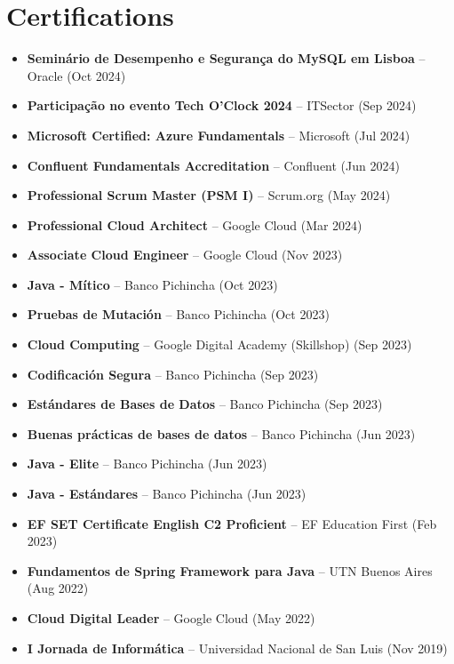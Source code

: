 \documentclass[10pt, letterpaper]{article}
\begin{document}
\section{Certifications}
\begin{itemize}[leftmargin=10pt, noitemsep]
    \item \textbf{Seminário de Desempenho e Segurança do MySQL em Lisboa} – Oracle (Oct 2024)
    \item \textbf{Participação no evento Tech O'Clock 2024} – ITSector (Sep 2024)
    \item \textbf{Microsoft Certified: Azure Fundamentals} – Microsoft (Jul 2024)
    \item \textbf{Confluent Fundamentals Accreditation} – Confluent (Jun 2024)
    \item \textbf{Professional Scrum Master (PSM I)} – Scrum.org (May 2024)
    \item \textbf{Professional Cloud Architect} – Google Cloud (Mar 2024)
    \item \textbf{Associate Cloud Engineer} – Google Cloud (Nov 2023)
    \item \textbf{Java - Mítico} – Banco Pichincha (Oct 2023)
    \item \textbf{Pruebas de Mutación} – Banco Pichincha (Oct 2023)
    \item \textbf{Cloud Computing} – Google Digital Academy (Skillshop) (Sep 2023)
    \item \textbf{Codificación Segura} – Banco Pichincha (Sep 2023)
    \item \textbf{Estándares de Bases de Datos} – Banco Pichincha (Sep 2023)
    \item \textbf{Buenas prácticas de bases de datos} – Banco Pichincha (Jun 2023)
    \item \textbf{Java - Elite} – Banco Pichincha (Jun 2023)
    \item \textbf{Java - Estándares} – Banco Pichincha (Jun 2023)
    \item \textbf{EF SET Certificate English C2 Proficient} – EF Education First (Feb 2023)
    \item \textbf{Fundamentos de Spring Framework para Java} – UTN Buenos Aires (Aug 2022)
    \item \textbf{Cloud Digital Leader} – Google Cloud (May 2022)
    \item \textbf{I Jornada de Informática} – Universidad Nacional de San Luis (Nov 2019)
\end{itemize}
\end{document}
